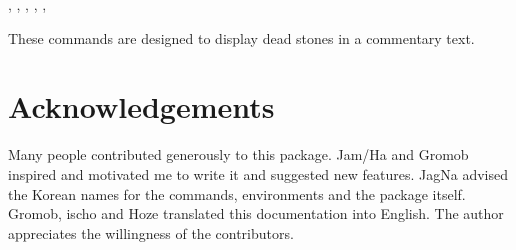 \documentclass[a4paper]{oblivoir}
\begin{document}
\medskip
{}, , \WhiteMText, \BlackMText,
\WhiteCText, \BlackCText
\medskip

These commands are designed to display dead stones in a commentary text.

\section{Acknowledgements}

Many people contributed generously to this package. 
Jam/Ha and Gromob inspired and motivated me to write it and suggested new features.
JagNa advised the Korean names for the commands, environments and the package itself.
Gromob, ischo and Hoze translated this documentation into English.
The author appreciates the willingness of the contributors.
\end{document}
